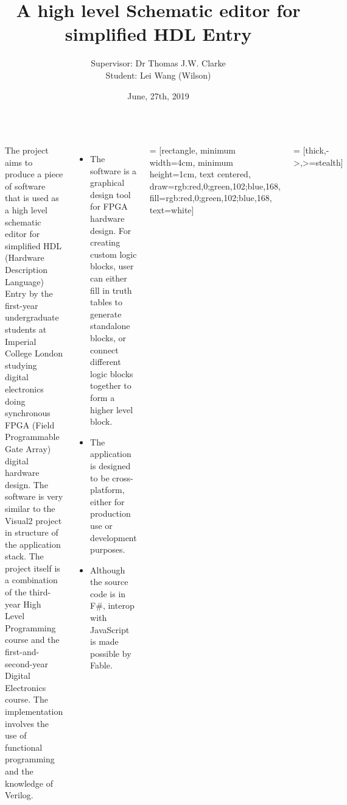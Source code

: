 \documentclass[12pt, a1paper, landscape, margin=10mm, innermargin=15mm, blockverticalspace=15mm, colspace=15mm, subcolspace=8mm]{tikzposter}
\title{A high level Schematic editor for simplified HDL Entry}
\author{Supervisor: Dr Thomas J.W. Clarke \\ Student: Lei Wang (Wilson)}
\date{June, 27th, 2019}
\institute{Imperial College London, the 27th of June, 2019}
\begin{document}
 
\maketitle

\begin{columns}
    {The project aims to produce a piece of software that is used as a high level schematic editor for simplified HDL (Hardware Description Language) Entry by the first-year undergraduate students at Imperial College London studying digital electronics doing synchronous FPGA (Field Programmable Gate Array) digital hardware design. The software is very similar to the Visual2 project in structure of the application stack. The project itself is a combination of the third-year High Level Programming course and the first-and-second-year Digital Electronics course. The implementation involves the use of functional programming and the knowledge of Verilog.}
    
    {
    
\begin{itemize}
    \item The software is a graphical design tool for FPGA hardware design. For creating custom logic blocks, user can either fill in truth tables to generate standalone blocks, or connect different logic blocks together to form a higher level block.
    \item The application is designed to be cross-platform, either for production use or development purposes.
    \item Although the source code is in F\#, interop with JavaScript is made possible by Fable.
\end{itemize}
    }
    
    {
 = [rectangle, minimum width=4cm, minimum height=1cm, text centered, draw={rgb:red,0;green,102;blue,168}, fill={rgb:red,0;green,102;blue,168}, text=white]

 = [thick,->,>=stealth]

}
\end{columns}
\end{document}
